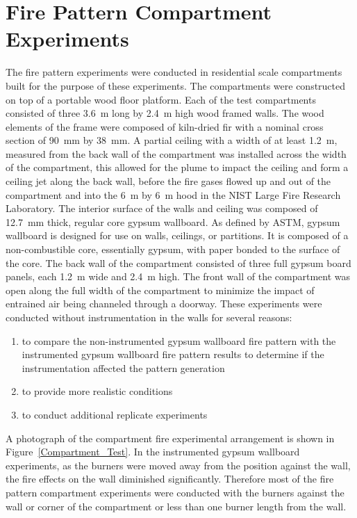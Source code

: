\documentclass[twoside]{uocthesis}
\begin{document}
\chapter{Fire Pattern Compartment Experiments}

The fire pattern experiments were conducted in residential scale compartments built for the purpose of these experiments.  The compartments were constructed on top of a portable wood floor platform.  Each of the test compartments consisted of three 3.6~m long by 2.4~m high wood framed walls. The wood elements of the frame were composed of kiln-dried fir with a nominal cross section of 90~mm by 38~mm.  A partial ceiling with a width of at least 1.2~m, measured from the back wall of the compartment was installed across the width of the compartment, this allowed for the plume to impact the ceiling and form a ceiling jet along the back wall, before the fire gases flowed up and out of the compartment and into the 6~m by 6~m hood in the NIST Large Fire Research Laboratory. The interior surface of the walls and ceiling was composed of 12.7~mm thick, regular core gypsum wallboard. As defined by ASTM, gypsum wallboard is designed for use on walls, ceilings, or partitions.  It is composed of a non-combustible core, essentially gypsum, with paper bonded to the surface of the core. The back wall of the compartment consisted of three full gypsum board panels, each 1.2~m wide and 2.4~m high.  The front wall of the compartment was open along the full width of the compartment to minimize the impact of entrained air being channeled through a doorway. These experiments were conducted without instrumentation in the walls for several reasons:
\begin{enumerate}
\item to compare the non-instrumented gypsum wallboard fire pattern with the instrumented gypsum wallboard fire pattern results to determine if the instrumentation affected the pattern generation
\item to provide more realistic conditions
\item to conduct additional replicate experiments
\end{enumerate}


A photograph of the compartment fire experimental arrangement is shown in Figure~\ref{Compartment_Test}. In the instrumented gypsum wallboard experiments, as the burners were moved away from the position against the wall, the fire effects on the wall diminished significantly.  Therefore most of the fire pattern compartment experiments were conducted with the burners against the wall or corner of the compartment or less than one burner length from the wall.
\end{document}
